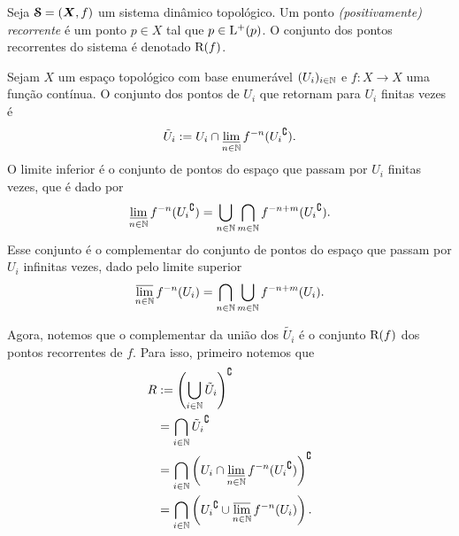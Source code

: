\begin{definition}
Seja $\bm{\mathcal{S}}=(\bm X,f)$ um sistema dinâmico topológico. Um ponto \emph{(positivamente) recorrente} é um ponto $p \in X$ tal que $p \in \mathrm{L}^+(p)$. O conjunto dos pontos recorrentes do sistema é denotado $\mathrm{R}(f)$.
\end{definition}

Sejam $X$ um espaço topológico com base enumerável $(U_i)_{i \in \mathbb{N}}$ e $f: X \to X$ uma função contínua. O conjunto dos pontos de $U_i$ que retornam para $U_i$ finitas vezes é
	\begin{equation*}
	\tilde U_i := U_i \cap \varliminf_{n \in \mathbb{N}} f^{-n}({U_i}^\complement).
	\end{equation*}
O limite inferior é o conjunto de pontos do espaço que passam por $U_i$ finitas vezes, que é dado por
	\begin{equation*}
	\varliminf_{n \in \mathbb{N}} f^{-n}({U_i}^\complement) = \bigcup_{n \in \mathbb{N}} \bigcap_{m \in \mathbb{N}} f^{-n+m}({U_i}^\complement).
	\end{equation*}
Esse conjunto é o complementar do conjunto de pontos do espaço que passam por $U_i$ infinitas vezes, dado pelo limite superior
	\begin{equation*}
	\varlimsup_{n \in \mathbb{N}} f^{-n}(U_i) = \bigcap_{n \in \mathbb{N}} \bigcup_{m \in \mathbb{N}} f^{-n+m}(U_i).
	\end{equation*}

Agora, notemos que o complementar da união dos $\tilde{U_i}$ é o conjunto $\mathrm{R}(f)$ dos pontos recorrentes de $f$. Para isso, primeiro notemos que
	\begin{align*}
	R &:= \left( \bigcup_{i \in \mathbb{N}} \tilde U_i \right)^\complement \\
		&= \bigcap_{i \in \mathbb{N}} {\tilde U_i}^\complement \\
		&= \bigcap_{i \in \mathbb{N}} \left( U_i \cap \varliminf_{n \in \mathbb{N}} f^{-n}({U_i}^\complement) \right)^\complement \\
		&= \bigcap_{i \in \mathbb{N}} \left( {U_i}^\complement \cup \varlimsup_{n \in \mathbb{N}} f^{-n}(U_i) \right).
	\end{align*}

